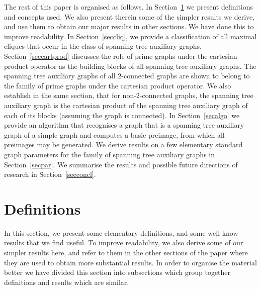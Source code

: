 \documentclass{llncs}
\begin{document}
The rest of this paper is organised as follows. In Section~\ref{secdef} we present definitions and concepts used. We also present therein some of the simpler results we derive, and use them to obtain our major results in other sections. We have done this to improve readability.  In Section~\ref{seccliq}, we provide a classification of all maximal cliques that occur in the class of spanning tree auxiliary graphs. Section~\ref{seccartprod} discusses the role of prime graphs under the cartesian product operator as the building blocks of all spanning tree auxiliary graphs. The spanning tree auxiliary graphs of all 2-connected graphs are shown to belong to the family of prime graphs under the cartesian product operator. We also establish in the same section, that for non-2-connected graphs, the spanning tree auxiliary graph is the cartesian product of the spanning tree auxiliary graph of each of its blocks (assuming the graph is connected). In Section~\ref{secalgo} we provide an algorithm that recognises a graph that is a spanning tree auxiliary graph of a simple graph and computes a basic preimage, from which all preimages may be generated. We derive results on a few elementary standard graph parameters for the family of spanning tree auxiliary graphs in Section~\ref{secpar}. We summarise the results and possible future directions of research in Section~\ref{secconcl}.

\section{Definitions}\label{secdef}
In this section, we present some elementary definitions, and some well know results that we find useful. To improve readability, we also derive some of our simpler results here, and refer to them in the other sections of the paper where they are used to obtain more substantial results. In order to organise the material better we have divided this section into subsections which group together definitions and results which are similar.
\end{document}
